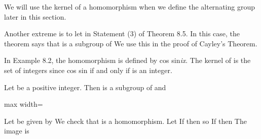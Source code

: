 \documentclass[11pt,oneside]{article}
\begin{document}
\begin{BookBody}

We will use the kernel of a homomorphism when we define the alternating group later in this section.

Another extreme is to let  in Statement (3) of Theorem 8.5. In this case, the theorem says that \BookInline{\phi [G]} is a subgroup of  We use this in the proof of Cayley’s Theorem.

 In Example 8.2, the homomorphism  is defined by  cos  sin\textit{ix}. The kernel of \BookInline{\phi } is the set of integers since cos sin if and only if  is an integer.

Let  be a positive integer. Then  is a subgroup of  and

\begin{center}\begin{adjustbox}{max width=\linewidth}\end{adjustbox}\end{center} \BookEnd{\blacktriangle}

 Let  be given by  We check that \BookInline{\phi } is a homomorphism. Let  If  then  so   If  then   The image \BookInline{\phi [\mathbb{Z}_{n}]} is \BookEnd{\blacktriangle}


\end{BookBody}
\end{document}
